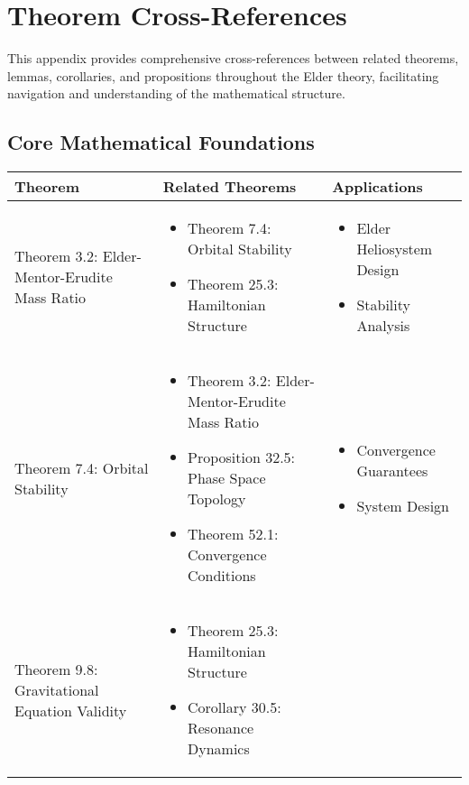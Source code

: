 \chapter{Theorem Cross-References}

This appendix provides comprehensive cross-references between related theorems, lemmas, corollaries, and propositions throughout the Elder theory, facilitating navigation and understanding of the mathematical structure.

\section{Core Mathematical Foundations}

\begin{table}[h]
\centering
\begin{tabular}{|l|p{7cm}|p{4cm}|}
\hline
\textbf{Theorem} & \textbf{Related Theorems} & \textbf{Applications} \\
\hline
Theorem 3.2: Elder-Mentor-Erudite Mass Ratio & 
\begin{itemize}
    \item Theorem 7.4: Orbital Stability
    \item Theorem 25.3: Hamiltonian Structure
\end{itemize} &
\begin{itemize}
    \item Elder Heliosystem Design
    \item Stability Analysis
\end{itemize} \\
\hline
Theorem 7.4: Orbital Stability &
\begin{itemize}
    \item Theorem 3.2: Elder-Mentor-Erudite Mass Ratio
    \item Proposition 32.5: Phase Space Topology
    \item Theorem 52.1: Convergence Conditions
\end{itemize} &
\begin{itemize}
    \item Convergence Guarantees
    \item System Design
\end{itemize} \\
\hline
Theorem 9.8: Gravitational Equation Validity &
\begin{itemize}
    \item Theorem 25.3: Hamiltonian Structure
    \item Corollary 30.5: Resonance Dynamics

\end{itemize}
\end{tabular}
\end{table}
